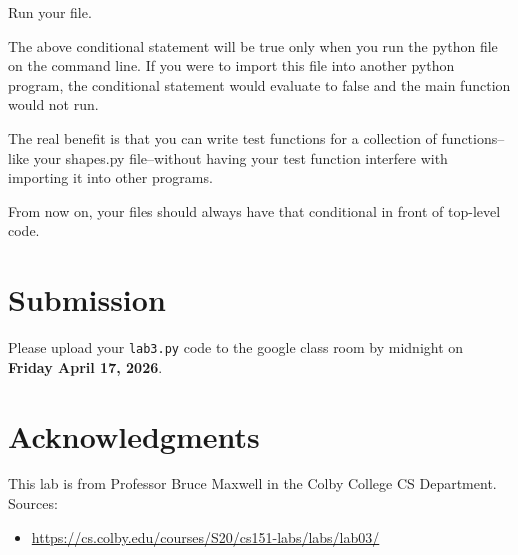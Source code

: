 \documentclass[12pt]{article}
\begin{document}
Run your file.

The above conditional statement will be true only when you run the python file on the command line. If you were to import this file into another python program, the conditional statement would evaluate to false and the main function would not run.

The real benefit is that you can write test functions for a collection of functions--like your shapes.py file--without having your test function interfere with importing it into other programs.

From now on, your files should always have that conditional in front of top-level code.

\section{Submission}
Please upload your \texttt{lab3.py} code to the google class room by midnight on \textbf{Friday April 17, 2026}.

\section{Acknowledgments}
This lab is from Professor Bruce Maxwell in the Colby College CS Department. 
Sources:
\begin{itemize}
\item \footnotesize{\url{https://cs.colby.edu/courses/S20/cs151-labs/labs/lab03/}}
\end{itemize}
\end{document}
